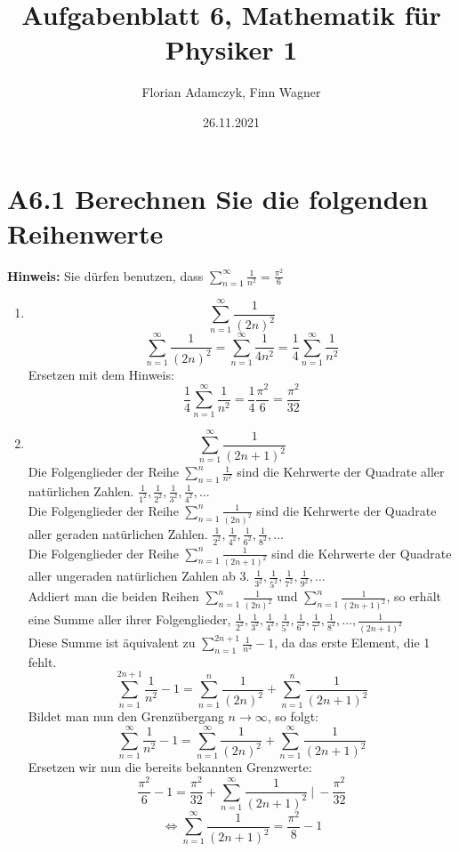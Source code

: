 \documentclass{article}
\date{26.11.2021}
\title{Aufgabenblatt 6, Mathematik für Physiker 1}
\author{Florian Adamczyk, Finn Wagner}
\begin{document}
    \maketitle

    \section*{A6.1 Berechnen Sie die folgenden Reihenwerte}
    \textbf{Hinweis:} Sie dürfen benutzen, dass \( \sum_{n=1}^{\infty} \frac{1}{n^2} = \frac{\pi^2}{6} \)

    \begin{enumerate}[ label = (\roman*) ]
        
        \item \[\sum_{n=1}^{\infty} \frac{1}{ {(2n)}^2 } \] 
        \[ \sum_{n=1}^{\infty} \frac{1}{ {(2n)}^2 } = \sum_{n=1}^{\infty} \frac{1}{ 4 n^2 } = \frac{1}{4} \sum_{n=1}^{\infty} \frac{1}{ n^2 } \]
        Ersetzen mit dem Hinweis:
        \[\frac{1}{4} \sum_{n=1}^{\infty} \frac{1}{ n^2 } = \frac{1}{4} \frac{\pi^2}{6} = \frac{\pi^2}{32} \]

        \item \[ \sum_{n=1}^{\infty} \frac{1}{ {(2n + 1)}^2 } \]
        Die Folgenglieder der Reihe \( \sum_{n=1}^{n} \frac{1}{n^2} \) sind die Kehrwerte der Quadrate aller natürlichen Zahlen.
        \( \frac{1}{1^2}, \frac{1}{2^2}, \frac{1}{3^2}, \frac{1}{4^2}, \ldots \) \\
        Die Folgenglieder der Reihe \( \sum_{n=1}^{n} \frac{1}{ {(2n)}^2 } \) sind die Kehrwerte der Quadrate aller geraden natürlichen Zahlen.
        \( \frac{1}{2^2}, \frac{1}{4^2}, \frac{1}{6^2}, \frac{1}{8^2}, \ldots \) \\
        Die Folgenglieder der Reihe \( \sum_{n=1}^{n} \frac{1}{ {(2n + 1)}^2 } \) sind die Kehrwerte der Quadrate aller ungeraden natürlichen Zahlen ab 3.
        \( \frac{1}{3^2}, \frac{1}{5^2}, \frac{1}{7^2}, \frac{1}{9^2}, \ldots \) \\
        Addiert man die beiden Reihen \( \sum_{n=1}^{n} \frac{1}{ {(2n)}^2 } \) und \( \sum_{n=1}^{n} \frac{1}{ {(2n + 1)}^2 } \),
        so erhält eine Summe aller ihrer Folgenglieder,
        \( \frac{1}{2^2}, \frac{1}{3^2}, \frac{1}{4^2}, \frac{1}{5^2}, \frac{1}{6^2}, \frac{1}{7^2}, \frac{1}{8^2}, \ldots, \frac{1}{ {( 2n+1 )}^2 } \) \\
        Diese Summe ist äquivalent zu \( \sum_{n=1}^{ 2n+1 } \frac{1}{n^2} - 1 \), da das erste Element, die 1 fehlt.
        \[ \sum_{n=1}^{ 2n+1 } \frac{1}{n^2} - 1 = \sum_{n=1}^{n} \frac{1}{ {(2n)}^2 } + \sum_{n=1}^{n} \frac{1}{ {(2n + 1)}^2 } \]
        Bildet man nun den Grenzübergang \( n \to \infty \), so folgt:
        \[ \sum_{n=1}^{ \infty } \frac{1}{n^2} - 1 = \sum_{n=1}^{ \infty } \frac{1}{ {(2n)}^2 } + \sum_{n=1}^{ \infty } \frac{1}{ {(2n + 1)}^2 } \]
        Ersetzen wir nun die bereits bekannten Grenzwerte:
        \[ \frac{\pi^2}{6} - 1 =  \frac{\pi^2}{32} + \sum_{n=1}^{ \infty } \frac{1}{ {(2n + 1)}^2 } \ | \ -\frac{\pi^2}{32}  \]
        \[ \Leftrightarrow \sum_{n=1}^{ \infty } \frac{1}{ {(2n + 1)}^2 } = \frac{ \pi^2 }{8} - 1 \]

    \end{enumerate}
   
\end{document}
